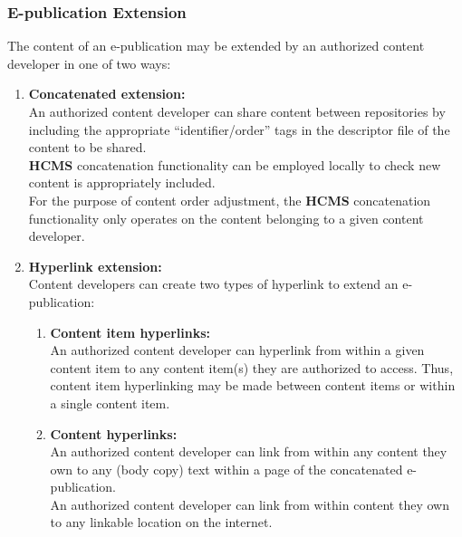 \documentclass[12pt]{article}
\begin{document}
\subsubsection*{E-publication Extension}
The content of an e-publication may be extended by an authorized content developer in one of two ways:
\begin{enumerate}
\item {\bf Concatenated extension:}\\
An authorized content developer can share content between repositories by including the appropriate ``identifier/order'' tags in the descriptor file of the content to be shared.\\
{\bf \small HCMS} concatenation functionality can be employed locally to check new content is appropriately included.\\
For the purpose of content order adjustment, the {\bf \small HCMS} concatenation functionality only operates on the content belonging to a given content developer.
\item {\bf Hyperlink extension:}\\
Content developers can create two types of hyperlink to extend an e-publication:
	\begin{enumerate}
	\item {\bf Content item hyperlinks:}\\
	An authorized content developer can hyperlink from within a given content item to any content item(s) they are authorized to access. Thus, content item hyperlinking may be made between content items or within a single content item. 
	\item {\bf Content hyperlinks:}\\
	An authorized content developer can link from within any content they own to any (body copy) text within a page of the concatenated e-publication.\\
	An authorized content developer can link from within content they own to any linkable location on the internet.
 	\end{enumerate}
\end{enumerate}
\end{document}
